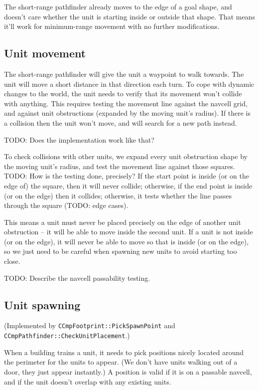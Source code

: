 \documentclass[a4paper,10pt]{article}
\begin{document}
The short-range pathfinder already moves to the edge of a goal shape,
and doesn't care whether the unit is starting inside or outside that shape.
That means it'll work for minimum-range movement with no further modifications.

\subsection{Unit movement}

The short-range pathfinder will give the unit a waypoint to walk towards.
The unit will move a short distance in that direction each turn.
To cope with dynamic changes to the world,
the unit needs to verify that its movement won't collide with anything.
This requires testing the movement line against the navcell grid,
and against unit obstructions (expanded by the moving unit's radius).
If there is a collision then the unit won't move, and will search for
a new path instead.

TODO: Does the implementation work like that?

To check collisions with other units,
we expand every unit obstruction shape by the moving unit's radius,
and test the movement line against those squares.
TODO: How is the testing done, precisely?
If the start point is inside (or on the edge of) the square,
then it will never collide;
otherwise, if the end point is inside (or on the edge)
then it collides;
otherwise, it tests whether the line passes through the square
(TODO: edge cases).

This means a unit must never be placed precisely on the edge
of another unit obstruction -- it will be able to move inside the second unit.
If a unit is not inside (or on the edge),
it will never be able to move so that is inside (or on the edge),
so we just need to be careful when spawning new units to avoid starting too close.

TODO: Describe the navcell passability testing.

\subsection{Unit spawning}

(Implemented by \texttt{CCmpFootprint::PickSpawnPoint}
and \texttt{CCmpPathfinder::CheckUnitPlacement}.)

When a building trains a unit, it needs to pick positions nicely located
around the perimeter for the units to appear.
(We don't have units walking out of a door, they just appear instantly.)
A position is valid if it is on a passable navcell,
and if the unit doesn't overlap with any existing units.
\end{document}
